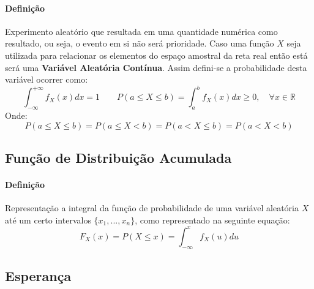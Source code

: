 \documentclass{article}
\begin{document}
        \paragraph{Definição}Experimento aleatório que resultada em uma quantidade numérica como resultado, ou seja, o evento em si não será prioridade. Caso uma função $X$ seja utilizada para relacionar os elementos do espaço amostral da reta real então está será uma \textbf{Variável Aleatória Contínua}. Assim defini-se a probabilidade desta variável ocorrer como:
            \begin{equation}
                \boxed{
                    \int_{-\infty}^{+\infty} f_{X}(x)dx = 1
                }
                \qquad
                \boxed{
                    P(a \le X \le b) = \int_{a}^{b} f_{X}(x) dx \ge 0, \quad \forall x\in\mathbb{R}
                }
            \end{equation}
        Onde:
            \begin{equation}
                \boxed{
                    P(a \le X \le b) =
                    P(a \le X < b) =
                    P(a < X \le b) =
                    P(a < X < b)
                }
            \end{equation}

        \subsection{Função de Distribuição Acumulada}
            \paragraph{Definição}Representação a integral da função de probabilidade de uma variável aleatória $X$ até um certo intervalos $\{x_{1}, ..., x_{n}\}$, como representado na seguinte equação:
                \begin{equation}
                    \boxed{
                        F_{X}(x) = P(X \le x) = 
                        \int_{-\infty}^{x} f_{X}(u)du
                    }
                \end{equation}

        \subsection{Esperança}
\end{document}
